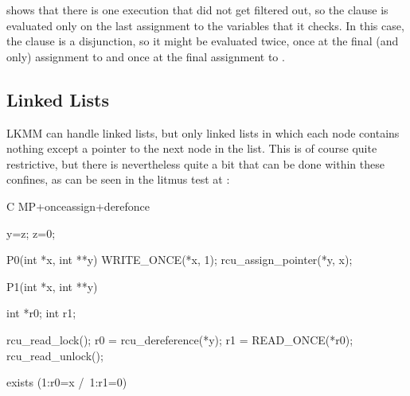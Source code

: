 \begin{fcvref}
 shows that there is one execution that did not get filtered out,
so the  clause is evaluated only on the last assignment to
the variables that it checks.
In this case, the  clause is a disjunction, so it might be
evaluated twice, once at the final (and only) assignment to 
and once at the final assignment to .
\end{fcvref}


\subsection{Linked Lists}

LKMM can handle linked lists, but only linked lists in which each node
contains nothing except a pointer to the next node in the list.
This is of course quite restrictive, but there is nevertheless quite a
bit that can be done within these confines, as can be seen in the litmus
test at :

\begin{fcvlabel}
\begin{VerbatimN}[commandchars=\%\@\$]
	C MP+onceassign+derefonce

	{
	y=z;     %
	z=0;     %
	}

	P0(int *x, int **y)
	{
		WRITE_ONCE(*x, 1);           %
		rcu_assign_pointer(*y, x);   %
	}

	P1(int *x, int **y)
	{
		int *r0;
		int r1;

		rcu_read_lock();             %
		r0 = rcu_dereference(*y);    %
		r1 = READ_ONCE(*r0);         %
		rcu_read_unlock();           %
	}

	exists (1:r0=x /\ 1:r1=0)
\end{VerbatimN}
\end{fcvlabel}

